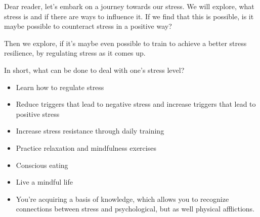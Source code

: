 \documentclass[../main.tex]{subfiles}
\begin{document}
Dear reader, let's embark on a journey towards our stress. We will explore, what stress is and if there are ways to influence it. If we find that this is possible, is it maybe possible to counteract stress in a positive way?

Then we explore, if it's maybe even possible to train to achieve a better stress resilience, by regulating stress as it comes up.

In short, what can be done to deal with one's stress level?

\begin{itemize}
\item Learn how to {regulate stress}
\item Reduce triggers that lead to {negative stress} and increase triggers that lead to {positive stress}
\item Increase {stress resistance} through daily training
\item Practice {relaxation} and {mindfulness} exercises
\item {Conscious eating}
\item Live a {mindful life}
\item You're acquiring a basis of knowledge, which allows you to recognize connections between stress and psychological, but as well physical afflictions.
  \end{itemize}
 
\end{document}
